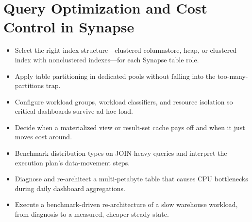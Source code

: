 \chapter{Query Optimization and Cost Control in Synapse}
%
\begin{objectives}
\begin{itemize}
    \item Select the right index structure---clustered columnstore, heap, or clustered index with nonclustered indexes---for each Synapse table role.
    \item Apply table partitioning in dedicated pools without falling into the too-many-partitions trap.
    \item Configure workload groups, workload classifiers, and resource isolation so critical dashboards survive ad-hoc load.
    \item Decide when a materialized view or result-set cache pays off and when it just moves cost around.
    \item Benchmark distribution types on JOIN-heavy queries and interpret the execution plan's data-movement steps.
    \item Diagnose and re-architect a multi-petabyte table that causes CPU bottlenecks during daily dashboard aggregations.
    \item Execute a benchmark-driven re-architecture of a slow warehouse workload, from diagnosis to a measured, cheaper steady state.
\end{itemize}
\end{objectives}

